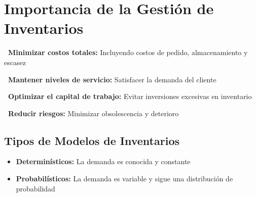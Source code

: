 \documentclass[12pt,a4paper]{book}
\begin{document}
	\section{Importancia de la Gestión de Inventarios}
	
	\begin{multicols}{2}
		\begin{tcolorbox}[colback=verdeclaro,colframe=verdeprincipal,boxrule=1pt,arc=5pt]
			\textbf{\faCheckCircle\ Minimizar costos totales:} Incluyendo costos de pedido, almacenamiento y escasez
		\end{tcolorbox}
		
		\begin{tcolorbox}[colback=azulclaro,colframe=azulprincipal,boxrule=1pt,arc=5pt]
			\textbf{\faUsers\ Mantener niveles de servicio:} Satisfacer la demanda del cliente
		\end{tcolorbox}
		
		\begin{tcolorbox}[colback=violetaclaro,colframe=moradoacento,boxrule=1pt,arc=5pt]
			\textbf{\faDollarSign\ Optimizar el capital de trabajo:} Evitar inversiones excesivas en inventario
		\end{tcolorbox}
		
		\begin{tcolorbox}[colback=naranjaclaro,colframe=naranjaacento,boxrule=1pt,arc=5pt]
			\textbf{\faShield\ Reducir riesgos:} Minimizar obsolescencia y deterioro
		\end{tcolorbox}
	\end{multicols}
	
	\subsection{Tipos de Modelos de Inventarios}
	
	\begin{tcolorbox}[enhanced,colback=grisclaro,colframe=azulprincipal,boxrule=2pt,arc=8pt,
		drop shadow,title={\bfseries\color{white} \faChartPie\ CLASIFICACIÓN POR PATRÓN DE DEMANDA}]
		
		\begin{itemize}[leftmargin=*,label=\textcolor{verdeprincipal}{\faArrowRight}]
			\item \textbf{\color{azulprincipal}Determinísticos:} La demanda es conocida y constante
			\item \textbf{\color{rojoacento}Probabilísticos:} La demanda es variable y sigue una distribución de probabilidad
		\end{itemize}
		
	\end{tcolorbox}
	
\end{document}
